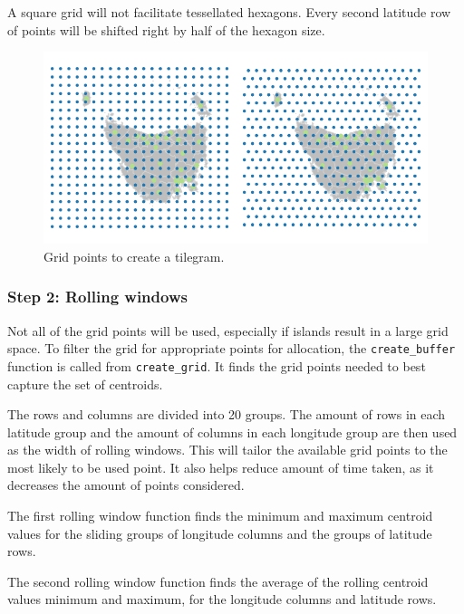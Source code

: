 A square grid will not facilitate tessellated hexagons. Every second
latitude row of points will be shifted right by half of the hexagon
size.

\begin{Schunk}
\begin{figure}
\includegraphics{algorithmRjournal_files/figure-latex/unnamed-chunk-3-1} \caption[Grid points to create a tilegram]{Grid points to create a tilegram.}\label{fig:unnamed-chunk-3}
\end{figure}
\end{Schunk}

\hypertarget{step-2-rolling-windows}{%
\subsubsection{Step 2: Rolling windows}\label{step-2-rolling-windows}}

Not all of the grid points will be used, especially if islands result in
a large grid space. To filter the grid for appropriate points for
allocation, the \texttt{create\_buffer} function is called from
\texttt{create\_grid}. It finds the grid points needed to best capture
the set of centroids.

The rows and columns are divided into 20 groups. The amount of rows in
each latitude group and the amount of columns in each longitude group
are then used as the width of rolling windows. This will tailor the
available grid points to the most likely to be used point. It also helps
reduce amount of time taken, as it decreases the amount of points
considered.

The first rolling window function finds the minimum and maximum centroid
values for the sliding groups of longitude columns and the groups of
latitude rows.

The second rolling window function finds the average of the rolling
centroid values minimum and maximum, for the longitude columns and
latitude rows.

